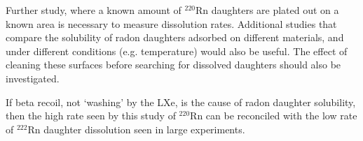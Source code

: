Further study, where a known amount of $^{220}$Rn daughters are plated out on a known area is necessary to measure dissolution rates. Additional studies that compare the solubility of radon daughters adsorbed on different materials, and under different conditions (e.g. temperature) would also be useful. The effect of cleaning these surfaces before searching for dissolved daughters should also be investigated. 

If beta recoil, not `washing' by the \ac{LXe}, is the cause of radon daughter solubility, then the high rate seen by this study of $^{220}$Rn can be reconciled with the low rate of $^{222}$Rn  daughter dissolution seen in large experiments.


